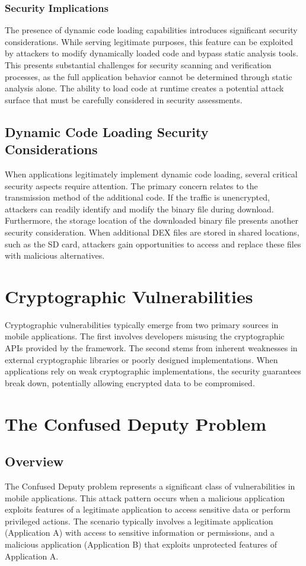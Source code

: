 \documentclass{article}
\begin{document}
\subsubsection{Security Implications}
The presence of dynamic code loading capabilities introduces significant security considerations. While serving legitimate purposes, this feature can be exploited by attackers to modify dynamically loaded code and bypass static analysis tools. This presents substantial challenges for security scanning and verification processes, as the full application behavior cannot be determined through static analysis alone. The ability to load code at runtime creates a potential attack surface that must be carefully considered in security assessments.

\subsection{Dynamic Code Loading Security Considerations}
When applications legitimately implement dynamic code loading, several critical security aspects require attention. The primary concern relates to the transmission method of the additional code. If the traffic is unencrypted, attackers can readily identify and modify the binary file during download. Furthermore, the storage location of the downloaded binary file presents another security consideration. When additional DEX files are stored in shared locations, such as the SD card, attackers gain opportunities to access and replace these files with malicious alternatives.

\section{Cryptographic Vulnerabilities}
Cryptographic vulnerabilities typically emerge from two primary sources in mobile applications. The first involves developers misusing the cryptographic APIs provided by the framework. The second stems from inherent weaknesses in external cryptographic libraries or poorly designed implementations. When applications rely on weak cryptographic implementations, the security guarantees break down, potentially allowing encrypted data to be compromised.

\section{The Confused Deputy Problem}
\subsection{Overview}
The Confused Deputy problem represents a significant class of vulnerabilities in mobile applications. This attack pattern occurs when a malicious application exploits features of a legitimate application to access sensitive data or perform privileged actions. The scenario typically involves a legitimate application (Application A) with access to sensitive information or permissions, and a malicious application (Application B) that exploits unprotected features of Application A.
\end{document}
